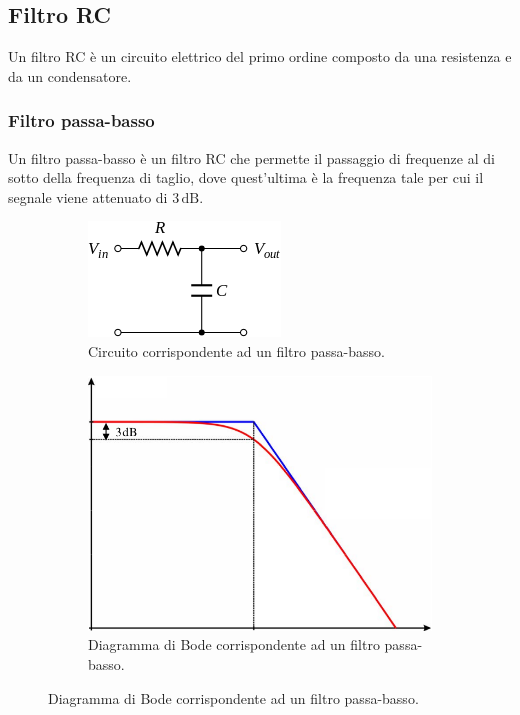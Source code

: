 \documentclass[a4paper]{article}
\begin{document}
		\subsection{Filtro RC}
			Un filtro RC è un circuito elettrico del primo ordine composto da una resistenza e da un condensatore.
			\subsubsection{Filtro passa-basso}
				Un filtro passa-basso è un filtro RC che permette il passaggio di frequenze al di sotto della frequenza di taglio, dove quest'ultima è la frequenza tale per cui il segnale viene attenuato di $ 3 \, \mathrm{dB} $.
				\begin{figure}[h!]
					\centering
					\begin{subfigure}{0.4\textwidth}
						\centering
						\includegraphics[scale=0.6]{filtroPassaBasso}
						\caption{Circuito corrispondente ad un filtro passa-basso.}
					\end{subfigure}
					\begin{subfigure}{0.4\textwidth}
						\centering
						\includegraphics[scale=0.4]{filtroPassaBassoBode}
						\caption{Diagramma di Bode corrispondente ad un filtro passa-basso.}
					\end{subfigure}
					\label{fig:filtroPassaBasso}
				\end{figure}
\end{document}
